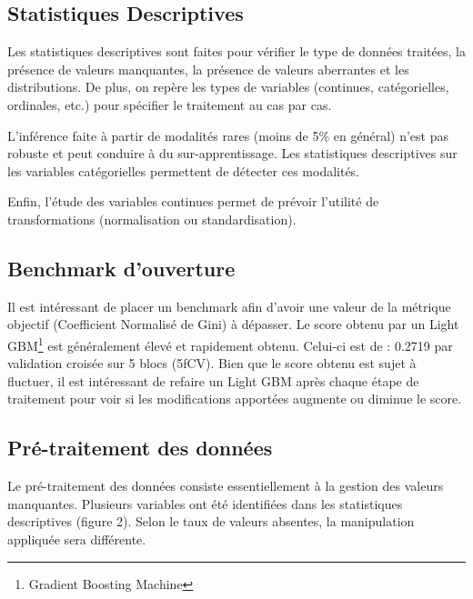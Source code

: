 \documentclass[french]{article}
\begin{document}
\begin{multicols}{2}
\subsection{Statistiques Descriptives}

Les statistiques descriptives sont faites pour vérifier le type de données traitées, la présence de valeurs manquantes, la présence de valeurs aberrantes et les distributions. De plus, on repère les types de variables (continues, catégorielles, ordinales, etc.) pour spécifier le traitement au cas par cas.

L'inférence faite à partir de modalités rares (moins de 5\% en général) n'est pas robuste et peut conduire à du sur-apprentissage. Les statistiques descriptives sur les variables catégorielles permettent de détecter ces modalités.

Enfin, l'étude des variables continues permet de prévoir l'utilité de transformations (normalisation ou standardisation).

\subsection{Benchmark d'ouverture}

Il est intéressant de placer un benchmark afin d'avoir une valeur de la métrique objectif (Coefficient Normalisé de Gini) à dépasser. Le score obtenu par un Light GBM\footnote{Gradient Boosting Machine} est généralement élevé et rapidement obtenu. Celui-ci est de : 0.2719 par validation croisée sur 5 blocs (5fCV). Bien que le score obtenu est sujet à fluctuer, il est intéressant de refaire un Light GBM après chaque étape de traitement pour voir si les modifications apportées augmente ou diminue le score.


\subsection{Pré-traitement des données}

Le pré-traitement des données consiste essentiellement à la gestion des valeurs manquantes. Plusieurs variables ont été identifiées dans les statistiques descriptives (figure 2). Selon le taux de valeurs absentes, la manipulation appliquée sera différente. 


\end{multicols}
\end{document}
